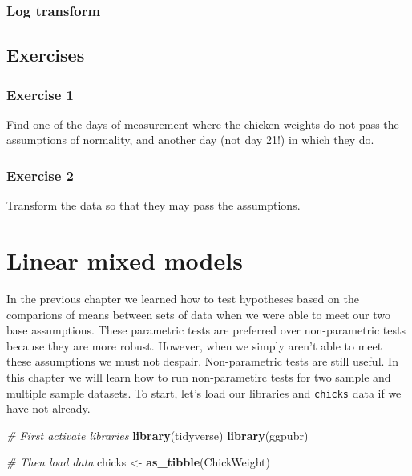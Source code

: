\documentclass[english,10pt,a4paper,oneside]{book}
\newenvironment{Shaded}{\begin{snugshade}}{\end{snugshade}}
\newcommand{\KeywordTok}[1]{\textcolor[rgb]{0.13,0.29,0.53}{\textbf{#1}}}
\newcommand{\StringTok}[1]{\textcolor[rgb]{0.31,0.60,0.02}{#1}}
\newcommand{\CommentTok}[1]{\textcolor[rgb]{0.56,0.35,0.01}{\textit{#1}}}
\newcommand{\NormalTok}[1]{#1}
\theoremstyle{definition}
\theoremstyle{definition}
\theoremstyle{definition}
\theoremstyle{remark}
\begin{document}
\subsection{Log transform}\label{log-transform}

\subsection{}\label{section}

\section{Exercises}\label{exercises-6}

\subsection{Exercise 1}\label{exercise-1-6}

Find one of the days of measurement where the chicken weights do not
pass the assumptions of normality, and another day (not day 21!) in
which they do.

\subsection{Exercise 2}\label{exercise-2-2}

Transform the data so that they may pass the assumptions.

\chapter{Linear mixed models}\label{linear-mixed-models}

In the previous chapter we learned how to test hypotheses based on the
comparions of means between sets of data when we were able to meet our
two base assumptions. These parametric tests are preferred over
non-parametric tests because they are more robust. However, when we
simply aren't able to meet these assumptions we must not despair.
Non-parametric tests are still useful. In this chapter we will learn how
to run non-parametirc tests for two sample and multiple sample datasets.
To start, let's load our libraries and \texttt{chicks} data if we have
not already.

\begin{Shaded}
\begin{Highlighting}[]
\CommentTok{# First activate libraries}
\KeywordTok{library}\NormalTok{(tidyverse)}
\KeywordTok{library}\NormalTok{(ggpubr)}

\CommentTok{# Then load data}
\NormalTok{chicks <-}\StringTok{ }\KeywordTok{as_tibble}\NormalTok{(ChickWeight)}
\end{Highlighting}
\end{Shaded}
\end{document}
